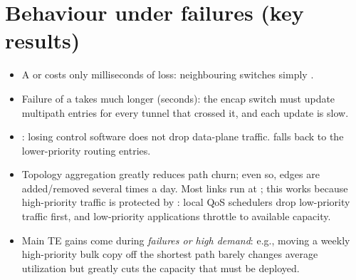 \section{Behaviour under failures (key results)}
\begin{itemize}
\item A  or  costs only milliseconds of loss: neighbouring switches simply .
\item Failure of a  takes much longer (seconds): the encap switch must update multipath entries for every tunnel that crossed it, and each update is slow.
\item {}: losing control software does not drop data-plane traffic.  falls back to the lower-priority routing entries.
\item Topology aggregation greatly reduces path churn; even so, edges are added/removed several times a day. Most links run at ; this works because high-priority traffic is protected by : local QoS schedulers drop low-priority traffic first, and low-priority applications throttle to available capacity.
\item Main TE gains come during \emph{failures or high demand}: e.g., moving a weekly high-priority bulk copy off the shortest path barely changes average utilization but greatly cuts the capacity that must be deployed.
\end{itemize}

